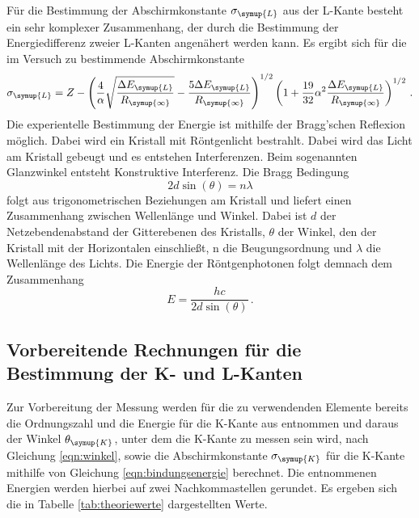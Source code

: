 Für die Bestimmung der Abschirmkonstante $\sigma_{\symup{L}}$ aus der L-Kante besteht ein
sehr komplexer Zusammenhang, der durch die Bestimmung der Energiedifferenz zweier
L-Kanten angenähert werden kann. Es ergibt sich für die im Versuch zu bestimmende
Abschirmkonstante
\begin{equation}
  \sigma_{\symup{L}}=Z-\left(\frac{4}{\alpha} \sqrt{\frac{\Delta E_{\symup{L}}}{R_{\symup{\infty}}}}
  -\frac{5\Delta E_{\symup{L}}}{R_{\symup{\infty}}}\right)^{1/2}
  \left(1+\frac{19}{32}\alpha^2 \frac{\Delta E_{\symup{L}}}{R_{\symup{\infty}}}\right)^{1/2} \,.
  \label{eqn:naeherung}
\end{equation}
Die experientelle Bestimmung der Energie ist mithilfe der Bragg'schen Reflexion
möglich. Dabei wird ein Kristall mit Röntgenlicht bestrahlt. Dabei wird das Licht
am Kristall gebeugt und es entstehen Interferenzen. Beim sogenannten Glanzwinkel
entsteht Konstruktive Interferenz. Die Bragg Bedingung
\begin{equation}
  2 d \sin(\theta)= n \lambda
  \label{eqn:bragg}
\end{equation}
folgt aus trigonometrischen Beziehungen am Kristall und liefert einen Zusammenhang
zwischen Wellenlänge und Winkel. Dabei ist $d$ der Netzebendenabstand der Gitterebenen
des Kristalls, $\theta$ der Winkel, den der Kristall mit der Horizontalen einschließt,
n die Beugungsordnung und $\lambda$ die Wellenlänge des Lichts.  Die Energie der
Röntgenphotonen folgt demnach dem Zusammenhang
\begin{equation}
  E=\frac{h c}{2 d \sin(\theta)} \,.
  \label{eqn:winkel}
\end{equation}


\subsection{Vorbereitende Rechnungen für die Bestimmung der K- und L-Kanten}
\label{sec:K_L_Kanten}

Zur Vorbereitung der Messung werden für die zu verwendenden Elemente bereits
die Ordnungszahl und die Energie für die K-Kante aus \cite{xraydata} entnommen und
daraus der Winkel $\theta_{\symup{K}}$, unter dem die K-Kante zu messen sein wird,
nach Gleichung \eqref{eqn:winkel}, sowie die Abschirmkonstante $\sigma_{\symup{K}}$
für die K-Kante mithilfe von Gleichung \eqref{eqn:bindungsenergie} berechnet.
Die entnommenen Energien werden hierbei auf zwei Nachkommastellen gerundet.
Es ergeben sich die in Tabelle \ref{tab:theoriewerte} dargestellten Werte.

